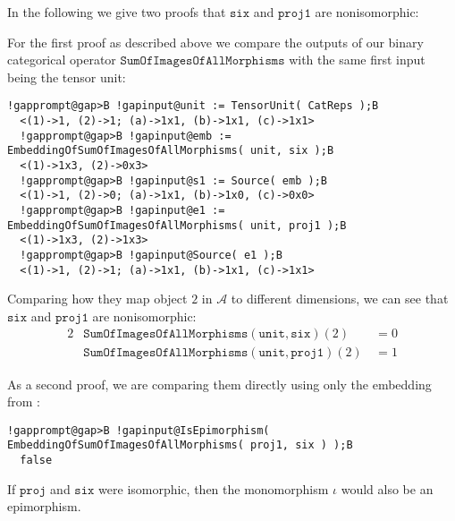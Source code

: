 \begin{computation}
In the following we give two proofs that $\mathtt{six}$ and $\mathtt{proj1}$ are nonisomorphic:

For the first proof as described above we compare the outputs of our binary categorical operator
$\mathtt{SumOfImagesOfAllMorphisms}$ with the same first input being the tensor unit:
\begin{Verbatim}[commandchars=!@B,fontsize=\small,frame=single,label=Example]
  !gapprompt@gap>B !gapinput@unit := TensorUnit( CatReps );B
  <(1)->1, (2)->1; (a)->1x1, (b)->1x1, (c)->1x1>
  !gapprompt@gap>B !gapinput@emb := EmbeddingOfSumOfImagesOfAllMorphisms( unit, six );B
  <(1)->1x3, (2)->0x3>
  !gapprompt@gap>B !gapinput@s1 := Source( emb );B
  <(1)->1, (2)->0; (a)->1x1, (b)->1x0, (c)->0x0>
  !gapprompt@gap>B !gapinput@e1 := EmbeddingOfSumOfImagesOfAllMorphisms( unit, proj1 );B
  <(1)->1x3, (2)->1x3>
  !gapprompt@gap>B !gapinput@Source( e1 );B
  <(1)->1, (2)->1; (a)->1x1, (b)->1x1, (c)->1x1>
\end{Verbatim}

Comparing how they map object $2$ in $\mathcal{A}$ to different dimensions, we can see that $\mathtt{six}$ and $\mathtt{proj1}$ are nonisomorphic:
\begin{alignat*}{2}
&\mathtt{SumOfImagesOfAllMorphisms}(\mathtt{unit},\mathtt{six})(2) &\,= 0 \\
&\mathtt{SumOfImagesOfAllMorphisms}(\mathtt{unit},\mathtt{proj1})(2) &\,= 1
\end{alignat*}

As a second proof, we are comparing them directly using only the embedding from :

\begin{Verbatim}[commandchars=!@B,fontsize=\small,frame=single,label=Example]
  !gapprompt@gap>B !gapinput@IsEpimorphism( EmbeddingOfSumOfImagesOfAllMorphisms( proj1, six ) );B
  false
\end{Verbatim}

If $\mathtt{proj}$ and $\mathtt{six}$ were isomorphic, then the monomorphism $\iota$ would also be an epimorphism.

\end{computation}

